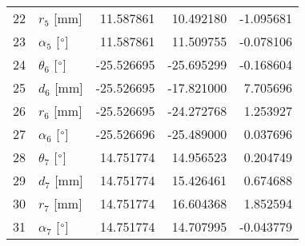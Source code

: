 \documentclass{standalone}%
\begin{document}
\begin{tabular}{llrrr}
22 &              $r_{5}$ [mm] &  11.587861 &  10.492180 &  -1.095681 \\
23 &  $\alpha_{5}$ [$\degree$] &  11.587861 &  11.509755 &  -0.078106 \\
24 &  $\theta_{6}$ [$\degree$] & -25.526695 & -25.695299 &  -0.168604 \\
25 &              $d_{6}$ [mm] & -25.526695 & -17.821000 &   7.705696 \\
26 &              $r_{6}$ [mm] & -25.526695 & -24.272768 &   1.253927 \\
27 &  $\alpha_{6}$ [$\degree$] & -25.526696 & -25.489000 &   0.037696 \\
28 &  $\theta_{7}$ [$\degree$] &  14.751774 &  14.956523 &   0.204749 \\
29 &              $d_{7}$ [mm] &  14.751774 &  15.426461 &   0.674688 \\
30 &              $r_{7}$ [mm] &  14.751774 &  16.604368 &   1.852594 \\
31 &  $\alpha_{7}$ [$\degree$] &  14.751774 &  14.707995 &  -0.043779 \\
\bottomrule
\end{tabular}
%
\end{document}
